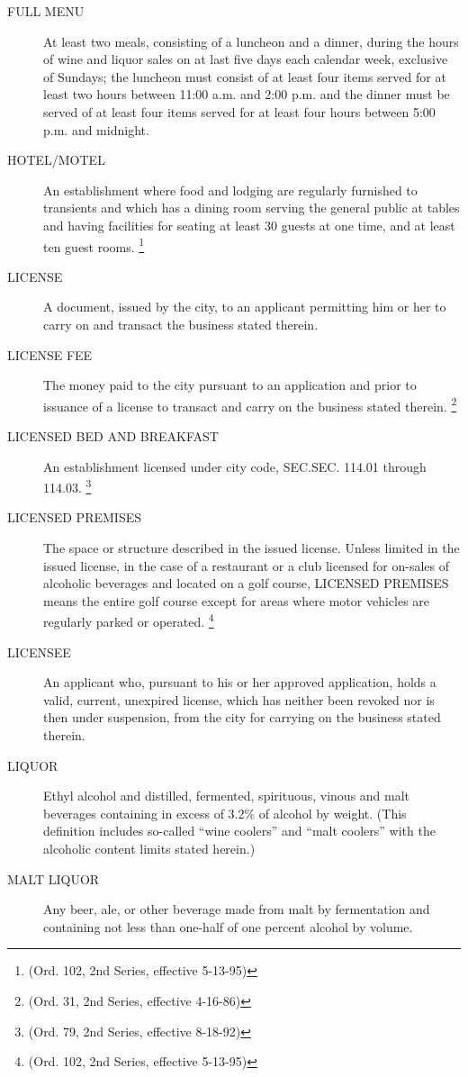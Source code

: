 \begin{description}
    \item[FULL MENU] At least two meals, consisting of a luncheon and a dinner, during the hours of wine and liquor sales on at last five days each calendar week, exclusive of Sundays; the luncheon must consist of at least four items served for at least two hours between 11:00 a.m. and 2:00 p.m. and the dinner must be served of at least four items served for at least four hours between 5:00 p.m. and midnight.
    \item[HOTEL/MOTEL] An establishment where food and lodging are regularly furnished to transients and which has a dining room serving the general public at tables and having facilities for seating at least 30 guests at one time, and at least ten guest rooms. \footnote{(Ord. 102, 2nd Series, effective 5-13-95)}
    \item[LICENSE] A document, issued by the city, to an applicant permitting him or her to carry on and transact the business stated therein.
    \item[LICENSE FEE] The money paid to the city pursuant to an application and prior to issuance of a license to transact and carry on the business stated therein. \footnote{(Ord. 31, 2nd Series, effective 4-16-86)}
    \item[LICENSED BED AND BREAKFAST] An establishment licensed under city code, SEC.SEC. 114.01 through 114.03. \footnote{(Ord. 79, 2nd Series, effective 8-18-92)}
    \item[LICENSED PREMISES] The space or structure described in the issued license.  Unless limited in the issued license, in the case of a restaurant or a club licensed for on-sales of alcoholic beverages and located on a golf course, LICENSED PREMISES means the entire golf course except for areas where motor vehicles are regularly parked or operated. \footnote{(Ord. 102, 2nd Series, effective 5-13-95)}
    \item[LICENSEE] An applicant who, pursuant to his or her approved application, holds a valid, current, unexpired license, which has neither been revoked nor is then under suspension, from the city for carrying on the business stated therein.
    \item[LIQUOR] Ethyl alcohol and distilled, fermented, spirituous, vinous and malt beverages containing in excess of 3.2\% of alcohol by weight. (This definition includes so-called “wine coolers” and “malt coolers” with the alcoholic content limits stated herein.)
    \item[MALT LIQUOR] Any beer, ale, or other beverage made from malt by fermentation and containing not less than one-half of one percent alcohol by volume.

\end{description}
